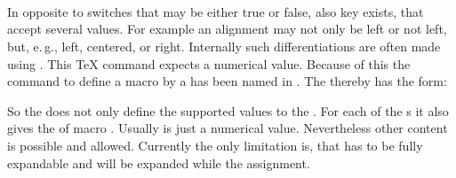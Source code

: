 \begin{Declaration}
                            \\
                            \\
  \\
\end{Declaration}
%
%
In opposite to switches that may be either true or false, also key exists,
that accept several values. For example an alignment may not only be left or
not left, but, e.\,g., left, centered, or right. Internally such
differentiations are often made using . This \TeX{} command
expects a numerical value. Because of this the command to define a macro by
a  has been named  in
. The  thereby has the form:
So the  does not only define the supported values to the
. For each of the s it also gives the
 of macro . Usually
 is just a numerical value. Nevertheless other content is
possible and allowed. Currently the only limitation is, that
 has to be fully expandable and will be expanded while the
assignment.
